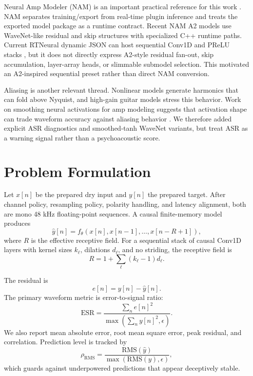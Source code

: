 \documentclass[11pt]{article}
\newcommand{\esr}{\mathrm{ESR}}
\newcommand{\rms}{\mathrm{RMS}}
\begin{document}
Neural Amp Modeler (NAM) is an important practical reference for this work
\cite{namrepo,namplugin,namcore}. NAM separates training/export from real-time
plugin inference and treats the exported model package as a runtime contract.
Recent NAM A2 models use WaveNet-like residual and skip structures with
specialized C++ runtime paths. Current RTNeural dynamic JSON can host
sequential Conv1D and PReLU stacks \cite{rtneural}, but it does not directly
express A2-style residual fan-out, skip accumulation, layer-array heads, or
slimmable submodel selection. This motivated an A2-inspired sequential preset
rather than direct NAM conversion.

Aliasing is another relevant thread. Nonlinear models generate harmonics that
can fold above Nyquist, and high-gain guitar models stress this behavior. Work
on smoothing neural activations for amp modeling suggests that activation shape
can trade waveform accuracy against aliasing behavior
\cite{steinmetz2025aliasing}. We therefore added explicit ASR diagnostics and
smoothed-tanh WaveNet variants, but treat ASR as a warning signal rather than a
psychoacoustic score.

\section{Problem Formulation}

Let \(x[n]\) be the prepared dry input and \(y[n]\) the prepared target. After
channel policy, resampling policy, polarity handling, and latency alignment,
both are mono 48 kHz floating-point sequences. A causal finite-memory model
produces
\begin{equation}
  \hat{y}[n] = f_\theta(x[n], x[n-1], \ldots, x[n-R+1]),
\end{equation}
where \(R\) is the effective receptive field. For a sequential stack of causal
Conv1D layers with kernel sizes \(k_\ell\), dilations \(d_\ell\), and no
striding, the receptive field is
\begin{equation}
  R = 1 + \sum_\ell (k_\ell - 1)d_\ell .
\end{equation}

The residual is
\begin{equation}
  e[n] = y[n] - \hat{y}[n].
\end{equation}
The primary waveform metric is error-to-signal ratio:
\begin{equation}
  \esr = \frac{\sum_n e[n]^2}{\max(\sum_n y[n]^2, \epsilon)} .
\end{equation}
We also report mean absolute error, root mean square error, peak residual, and
correlation. Prediction level is tracked by
\begin{equation}
  \rho_{\rms} = \frac{\rms(\hat{y})}{\max(\rms(y), \epsilon)} ,
\end{equation}
which guards against underpowered predictions that appear deceptively stable.
\end{document}
